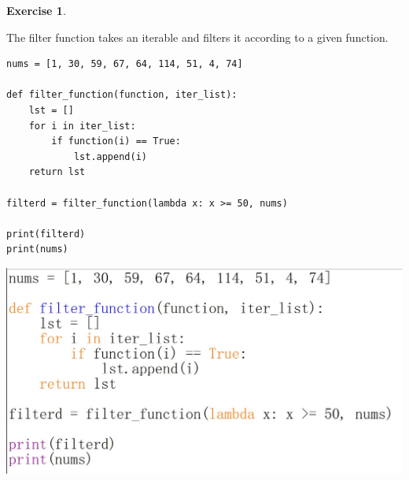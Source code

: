 \documentclass[11pt,a4paper,leqno]{article}
\theoremstyle{definition}
\newtheorem{exercise}{Exercise}
\begin{document}
\begin{exercise}
\begin{enumerate}
The filter function takes an iterable and filters it according to a given function.
\begin{center}
    \begin{verbatim}
nums = [1, 30, 59, 67, 64, 114, 51, 4, 74]

def filter_function(function, iter_list):
    lst = []
    for i in iter_list:
        if function(i) == True:
            lst.append(i)
    return lst

filterd = filter_function(lambda x: x >= 50, nums)

print(filterd)
print(nums)
    \end{verbatim}
\includegraphics[scale=0.5]{filter.jpg}
\end{center}

    \end{enumerate}
\end{exercise}


\end{document}
